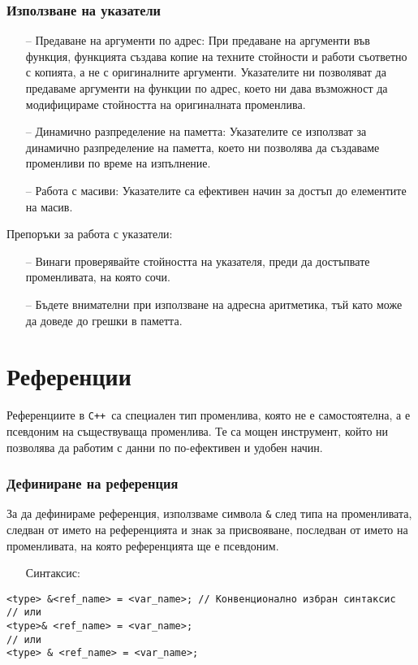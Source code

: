 \documentclass[oneside]{book}
\newcommand*{\code}[1]{\texttt{#1}}
\newcommand*{\cpp}{\texttt{C++}\ }
\begin{document}
\subsubsection{Използване на указатели}
\begin{itemize}
    \item[--] Предаване на аргументи по адрес: При предаване на аргументи във функция, функцията създава копие на техните стойности и работи съответно с копията, а не с оригиналните аргументи. Указателите ни позволяват да предаваме аргументи на функции по адрес, което ни дава възможност да модифицираме стойността на оригиналната променлива.
    \item[--] Динамично разпределение на паметта: Указателите се използват за динамично разпределение на паметта, което ни позволява да създаваме променливи по време на изпълнение.
    \item[--] Работа с масиви: Указателите са ефективен начин за достъп до елементите на масив.
\end{itemize}

Препоръки за работа с указатели:
\begin{itemize}
    \item[--] Винаги проверявайте стойността на указателя, преди да достъпвате променливата, на която сочи.
    \item[--] Бъдете внимателни при използване на адресна аритметика, тъй като може да доведе до грешки в паметта.
\end{itemize}

\section{Референции}
Референциите в \cpp са специален тип променлива, която не е самостоятелна, а е псевдоним на съществуваща променлива. Те са мощен инструмент, който ни позволява да работим с данни по по-ефективен и удобен начин.

\subsubsection{Дефиниране на референция}
За да дефинираме референция, използваме символа \code{\&} след типа на променливата, следван от името на референцията и знак за присвояване, последван от името на променливата, на която референцията ще е псевдоним.

\begin{itemize}\item[Синтаксис:]\end{itemize}
\begin{mdframed}\begin{lstlisting}
<type> &<ref_name> = <var_name>; // Конвенционално избран синтаксис
// или
<type>& <ref_name> = <var_name>;
// или
<type> & <ref_name> = <var_name>;
\end{lstlisting}\end{mdframed}
\end{document}
